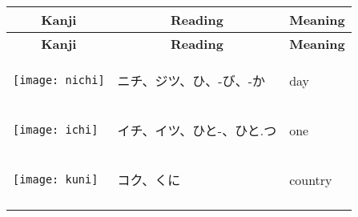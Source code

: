 \documentclass[a4paper,12pt]{extarticle}
\begin{document}
\begin{longtable}{|lp{6cm}p{4cm}|}
	\multicolumn{1}{c}{\textbf{Kanji}} & \multicolumn{1}{c}{\textbf{Reading}} & \multicolumn{1}{c}{\textbf{Meaning}} \\ \hline
	\endfirsthead

	\multicolumn{1}{c}{\textbf{Kanji}} & \multicolumn{1}{c}{\textbf{Reading}} & \multicolumn{1}{c}{\textbf{Meaning}} \\ \hline
	\endhead

	\hline
	\endfoot

	\hline \hline
	\endlastfoot

	\begin{minipage}{0.3\textwidth}
		\centerline{
			\texttt{[image: nichi]}
		}
	\end{minipage}
	                                   &
	\begin{CJK}{UTF8}{min}ニチ、ジツ、ひ、-び、-か\end{CJK}
	                                   &
	day
	\\
	\begin{minipage}{0.3\textwidth}
		\centerline{
			\texttt{[image: ichi]}
		}
	\end{minipage}
	                                   &
	\begin{CJK}{UTF8}{min}イチ、イツ、ひと-、ひと.つ\end{CJK}
	                                   &
	one
	\\
	\begin{minipage}{0.3\textwidth}
		\centerline{
			\texttt{[image: kuni]}
		}
	\end{minipage}
	                                   &
	\begin{CJK}{UTF8}{min}コク、くに\end{CJK}
	                                   &
	country
	\\
	\begin{minipage}{0.3\textwidth}

\end{minipage}
\end{longtable}
\end{document}
